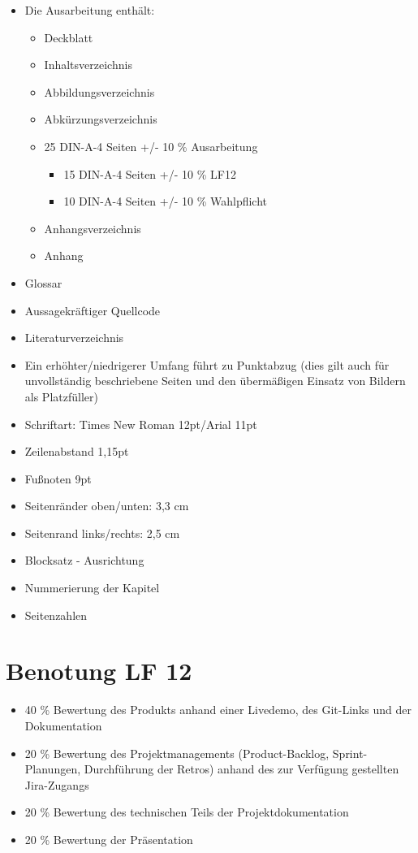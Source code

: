 \begin{itemize}
    \item Die Ausarbeitung enthält:
    \begin{itemize}
        \item Deckblatt
        \item Inhaltsverzeichnis
        \item Abbildungsverzeichnis
        \item Abkürzungsverzeichnis
        \item 25 DIN-A-4 Seiten +/- 10 \% Ausarbeitung
        \begin{itemize}
            \item 15 DIN-A-4 Seiten +/- 10 \% LF12
            \item 10 DIN-A-4 Seiten +/- 10 \% Wahlpflicht
        \end{itemize}
        \item Anhangsverzeichnis
        \item Anhang
    \end{itemize}
    \item Glossar
    \item Aussagekräftiger Quellcode
    \item Literaturverzeichnis
    \item Ein erhöhter/niedrigerer Umfang führt zu Punktabzug (dies gilt auch für unvollständig beschriebene Seiten und den übermäßigen Einsatz von Bildern als Platzfüller)
    \item Schriftart: Times New Roman 12pt/Arial 11pt
    \item Zeilenabstand 1,15pt
    \item Fußnoten 9pt
    \item Seitenränder oben/unten: 3,3 cm
    \item Seitenrand links/rechts: 2,5 cm
    \item Blocksatz - Ausrichtung
    \item Nummerierung der Kapitel
    \item Seitenzahlen
\end{itemize}

\section*{Benotung LF 12}

\begin{itemize}
    \item 40 \% Bewertung des Produkts anhand einer Livedemo, des Git-Links und der Dokumentation
    \item 20 \% Bewertung des Projektmanagements (Product-Backlog, Sprint-Planungen, Durchführung der Retros) anhand des zur Verfügung gestellten Jira-Zugangs
    \item 20 \% Bewertung des technischen Teils der Projektdokumentation
    \item 20 \% Bewertung der Präsentation
\end{itemize}

